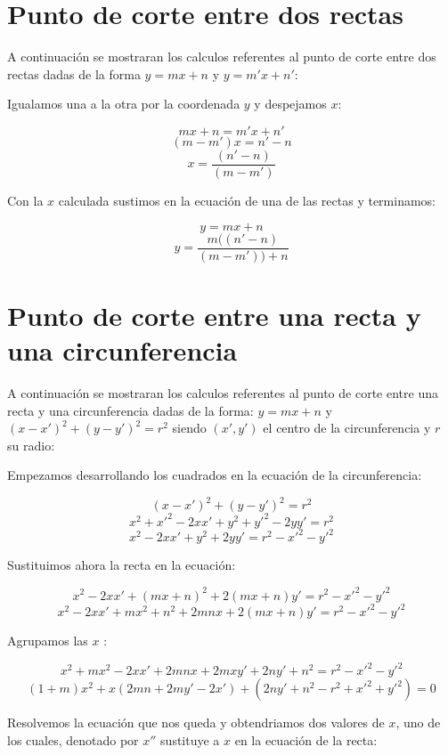 
\section{Punto de corte entre dos rectas}

A continuación se mostraran los calculos referentes al punto de corte entre dos rectas dadas de la forma $y = mx + n$ y $y = m'x + n'$: \par

Igualamos una a la otra por la coordenada $y$ y despejamos $x$:\par

$$mx+n = m'x+n'$$
$$(m-m')x = n'-n$$
$$x = \frac{(n'-n)}{(m-m')}$$

Con la $x$ calculada sustimos en la ecuación de una de las rectas y terminamos:\par

$$y = mx+n$$
$$y = \frac{m((n'-n)}{(m-m')) + n}$$

\section{Punto de corte entre una recta y una circunferencia}

A continuación se mostraran los calculos referentes al punto de corte entre una recta y una circunferencia dadas de la forma: $y = mx + n$ y $(x-x')^2 + (y -y')^2 = r^2$ siendo $(x', y')$ el centro de la circunferencia y $r$ su radio: \par

Empezamos desarrollando los cuadrados en la ecuación de la circunferencia:\par

$$(x-x')^2 + (y -y')^2 = r^2$$
$$x^2 + x'^2 - 2xx' + y^2 + y'^2 - 2yy' = r^2$$
$$x^2 - 2xx' + y^2 + 2yy' = r^2 - x'^2 - y'^2$$

Sustituimos ahora la recta en la ecuación:\par


$$x^2 - 2xx' + (mx + n)^2 + 2(mx + n)y' = r^2 - x'^2 - y'^2$$
$$x^2 - 2xx' + mx^2 + n^2 + 2mnx + 2(mx + n)y' = r^2 - x'^2 - y'^2$$

Agrupamos las $x$ :\par


$$x^2 + mx^2 - 2xx' + 2mnx + 2mxy' + 2ny' + n^2 = r^2 - x'^2 - y'^2$$
$$(1+m)x^2 + x( 2mn + 2my' - 2x' ) + (2ny' + n^2 - r^2 + x'^2 + y'^2) = 0$$

Resolvemos la ecuación que nos queda y obtendriamos dos valores de $x$, uno de los cuales, denotado por $x''$ sustituye a $x$ en la ecuación de la recta:\par

